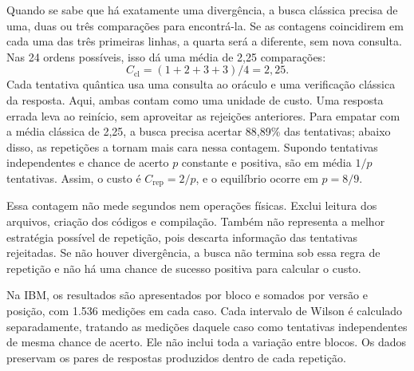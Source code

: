 \documentclass[conference]{IEEEtran}
\begin{document}
Quando se sabe que há exatamente uma divergência, a busca clássica precisa de uma, duas ou três comparações para encontrá-la. Se as contagens coincidirem em cada uma das três primeiras linhas, a quarta será a diferente, sem nova consulta. Nas 24 ordens possíveis, isso dá uma média de 2,25 comparações:
\begin{equation}
 C_{\mathrm{cl}}=(1+2+3+3)/4=2{,}25.
\end{equation}
Cada tentativa quântica usa uma consulta ao oráculo e uma verificação clássica da resposta. Aqui, ambas contam como uma unidade de custo. Uma resposta errada leva ao reinício, sem aproveitar as rejeições anteriores. Para empatar com a média clássica de 2,25, a busca precisa acertar 88,89\% das tentativas; abaixo disso, as repetições a tornam mais cara nessa contagem. Supondo tentativas independentes e chance de acerto $p$ constante e positiva, são em média $1/p$ tentativas. Assim, o custo é $C_{\mathrm{rep}}=2/p$, e o equilíbrio ocorre em $p=8/9$.

Essa contagem não mede segundos nem operações físicas. Exclui leitura dos arquivos, criação dos códigos e compilação. Também não representa a melhor estratégia possível de repetição, pois descarta informação das tentativas rejeitadas. Se não houver divergência, a busca não termina sob essa regra de repetição e não há uma chance de sucesso positiva para calcular o custo.

Na IBM, os resultados são apresentados por bloco e somados por versão e posição, com 1.536 medições em cada caso. Cada intervalo de Wilson é calculado separadamente, tratando as medições daquele caso como tentativas independentes de mesma chance de acerto. Ele não inclui toda a variação entre blocos. Os dados preservam os pares de respostas produzidos dentro de cada repetição.




\end{document}
